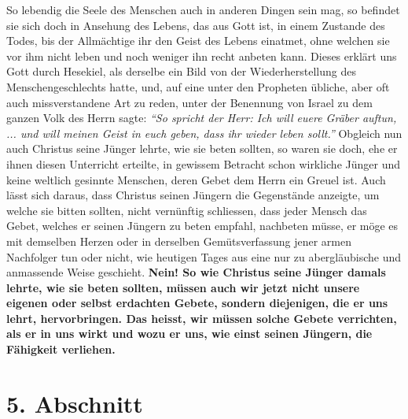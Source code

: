  So lebendig die Seele des Menschen auch in anderen
Dingen sein mag, so befindet
sie sich doch in Ansehung des Lebens, das aus Gott ist, in einem Zustande des
Todes, bis der Allmächtige ihr den Geist des Lebens einatmet, ohne welchen sie
vor ihm nicht leben und noch weniger ihn recht anbeten kann. Dieses erklärt uns
Gott durch Hesekiel, als derselbe ein Bild von der Wiederherstellung des
Menschengeschlechts hatte, und,
auf eine unter den Propheten übliche, aber oft auch
missverstandene Art zu
reden, unter der Benennung von Israel zu dem
ganzen Volk des Herrn sagte:
\textit{"`So spricht der Herr: Ich will euere Gräber auftun, ... und will meinen
Geist in
euch geben, dass ihr wieder leben sollt."'}
Obgleich nun auch Christus seine
Jünger lehrte, wie sie beten sollten, so waren sie doch, ehe er ihnen diesen
Unterricht erteilte, in gewissem Betracht schon wirkliche Jünger und keine
weltlich gesinnte Menschen, deren Gebet dem Herrn ein Greuel ist. Auch
lässt sich daraus, dass Christus seinen Jüngern die Gegenstände anzeigte, um
welche sie bitten sollten, nicht
vernünftig schliessen, dass jeder Mensch das Gebet, welches er seinen Jüngern zu
beten empfahl, nachbeten müsse, er möge es mit
demselben Herzen oder in
derselben Gemütsverfassung jener armen Nachfolger tun oder nicht, wie heutigen
Tages aus eine nur zu abergläubische und anmassende Weise geschieht.
\label{ref:06_04_gebet} \textbf{Nein! So
wie Christus seine Jünger damals lehrte, wie sie beten sollten, müssen auch wir
jetzt nicht unsere eigenen oder selbst erdachten Gebete, sondern diejenigen, die
er uns
lehrt, hervorbringen. Das heisst, wir müssen solche Gebete verrichten, als er
in uns wirkt und wozu er uns, wie einst seinen Jüngern, die Fähigkeit
verliehen.}

\section{5. Abschnitt} \label{kap6_ab5}

